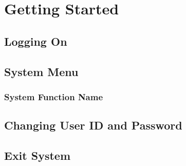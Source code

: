 \section{Getting Started}

\subsection{Logging On}

\subsection{System Menu}

\subsubsection{System Function Name}

\subsection{Changing User ID and Password}

\subsection{Exit System}

